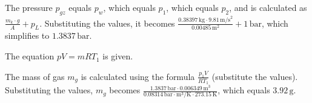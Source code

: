 The pressure \( p_{gz} \) equals \( p_{w} \), which equals \( p_{1} \), which equals \( p_{2} \), and is calculated as \( \frac{m_{k} \cdot g}{A} + p_{L} \). Substituting the values, it becomes \( \frac{0.38397 \, \text{kg} \cdot 9.81 \, \text{m/s}^2}{0.00485 \, \text{m}^2} + 1 \, \text{bar} \), which simplifies to \( 1.3837 \, \text{bar} \).

The equation \( pV = mRT_{1} \) is given.

The mass of gas \( m_{g} \) is calculated using the formula \( \frac{p_{1}V}{RT_{1}} \) (substitute the values). Substituting the values, \( m_{g} \) becomes \( \frac{1.3837 \, \text{bar} \cdot 0.006349 \, \text{m}^3}{0.08314 \, \text{bar} \cdot \text{m}^3/\text{K} \cdot 273.15 \, \text{K}} \), which equals \( 3.92 \, \text{g} \).